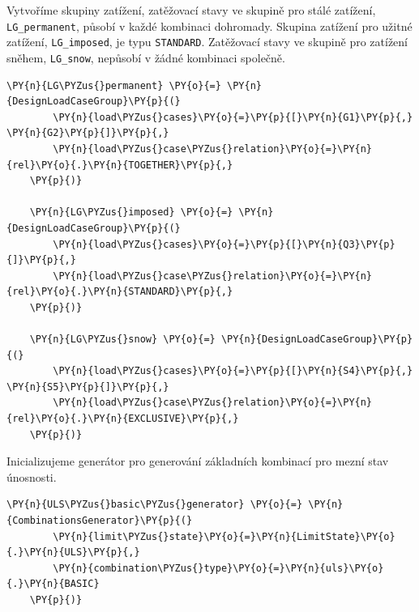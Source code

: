     Vytvoříme skupiny zatížení, zatěžovací stavy ve skupině pro stálé zatížení, \texttt{LG\_permanent}, působí v každé kombinaci dohromady. Skupina zatížení pro užitné zatížení, \texttt{LG\_imposed}, je typu \texttt{STANDARD}. Zatěžovací stavy ve skupině pro zatížení sněhem, \texttt{LG\_snow}, nepůsobí v žádné kombinaci společně.
        \begin{tcolorbox}[breakable, size=fbox, boxrule=1pt, pad at break*=1mm,colback=cellbackground, colframe=cellborder]
    \begin{Verbatim}[commandchars=\\\{\}]
    \PY{n}{LG\PYZus{}permanent} \PY{o}{=} \PY{n}{DesignLoadCaseGroup}\PY{p}{(}
        \PY{n}{load\PYZus{}cases}\PY{o}{=}\PY{p}{[}\PY{n}{G1}\PY{p}{,} \PY{n}{G2}\PY{p}{]}\PY{p}{,}
        \PY{n}{load\PYZus{}case\PYZus{}relation}\PY{o}{=}\PY{n}{rel}\PY{o}{.}\PY{n}{TOGETHER}\PY{p}{,}
    \PY{p}{)}
    
    \PY{n}{LG\PYZus{}imposed} \PY{o}{=} \PY{n}{DesignLoadCaseGroup}\PY{p}{(}
        \PY{n}{load\PYZus{}cases}\PY{o}{=}\PY{p}{[}\PY{n}{Q3}\PY{p}{]}\PY{p}{,}
        \PY{n}{load\PYZus{}case\PYZus{}relation}\PY{o}{=}\PY{n}{rel}\PY{o}{.}\PY{n}{STANDARD}\PY{p}{,}
    \PY{p}{)}
    
    \PY{n}{LG\PYZus{}snow} \PY{o}{=} \PY{n}{DesignLoadCaseGroup}\PY{p}{(}
        \PY{n}{load\PYZus{}cases}\PY{o}{=}\PY{p}{[}\PY{n}{S4}\PY{p}{,} \PY{n}{S5}\PY{p}{]}\PY{p}{,}
        \PY{n}{load\PYZus{}case\PYZus{}relation}\PY{o}{=}\PY{n}{rel}\PY{o}{.}\PY{n}{EXCLUSIVE}\PY{p}{,}
    \PY{p}{)}
    \end{Verbatim}
    \end{tcolorbox}
    
    Inicializujeme generátor pro generování základních kombinací pro mezní stav únosnosti.
        \begin{tcolorbox}[breakable, size=fbox, boxrule=1pt, pad at break*=1mm,colback=cellbackground, colframe=cellborder]
    \begin{Verbatim}[commandchars=\\\{\}]
    \PY{n}{ULS\PYZus{}basic\PYZus{}generator} \PY{o}{=} \PY{n}{CombinationsGenerator}\PY{p}{(}
        \PY{n}{limit\PYZus{}state}\PY{o}{=}\PY{n}{LimitState}\PY{o}{.}\PY{n}{ULS}\PY{p}{,}
        \PY{n}{combination\PYZus{}type}\PY{o}{=}\PY{n}{uls}\PY{o}{.}\PY{n}{BASIC}
    \PY{p}{)}
    \end{Verbatim}
    \end{tcolorbox}
    

